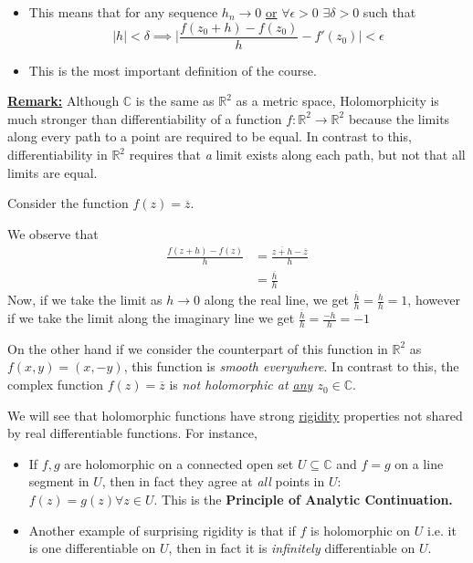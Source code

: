\documentclass{article}
\newcommand{\R}{\mathbb{R}}
\newcommand{\C}{\mathbb{C}}
\begin{document}
\vskip 0.5cm
\begin{itemize}
  \item   This means that for any sequence $h_n \rightarrow 0$ \underline{or} $\forall \epsilon > 0$ $\exists \delta > 0$ such that 
  \[ |h| < \delta \implies \lvert \frac{f(z_0 + h)-f(z_0)}{h} - f'(z_0) \rvert < \epsilon\]

  \item This is the most important definition of the course.
\end{itemize}

\underline{\textbf{Remark:}} Although $\C$ is the same as $\R^2$ as a metric space, Holomorphicity is much stronger than differentiability of a function $f : \R^2 \rightarrow \R^2$ because the limits along every path to a point are required to be equal. In contrast to this, differentiability in $\R^2$ requires that \emph{a} limit exists along each path, but not that all limits are equal.

\vskip 0.5cm
 Consider the function $f(z) = \overline{z}$.

\vskip 0.5cm
We observe that 
\begin{align*}
  \frac{f(z+h)-f(z)}{h} &= \frac{\overline{z+h}-\overline{z}}{h} \\
  &= \frac{\overline{h}}{h}
\end{align*}
Now, if we take the limit as $h \rightarrow 0$ along the real line, we get $\frac{\overline{h}}{h} = \frac{h}{h} = 1$, however if we take the limit along 
the imaginary line we get $\frac{\overline{h}}{h} = \frac{-h}{h} = -1$

\vskip 0.5cm
On the other hand if we consider the counterpart of this function in $\R^2$ as 
$f(x, y) = (x, -y)$, this function is \emph{smooth everywhere}. In contrast to this, the complex function $f(z) = \overline{z}$ is \emph{not holomorphic at \underline{any} $z_0 \in \C$}.

\vskip 0.5cm
We will see that holomorphic functions have strong \underline{rigidity} properties not shared by real differentiable functions. For instance,
\begin{itemize}
  \item If $f, g$ are holomorphic on a connected open set $U \subseteq \C$ and $f = g$ on a line segment in $U$, then in fact they agree at \emph{all} points in $U$: $f(z) = g(z) \forall z \in U$. This is the \textbf{Principle of Analytic Continuation.}
  \item Another example of surprising rigidity is that if $f$ is holomorphic on $U$ i.e. it is one differentiable on $U$, then in fact it is \emph{infinitely} differentiable on $U$.
\end{itemize}
\end{document}
